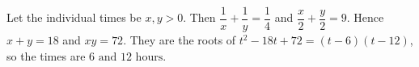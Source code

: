 Let the individual times be $x,y>0$. Then $\dfrac{1}{x}+\dfrac{1}{y}=\dfrac{1}{4}$ and $\dfrac{x}{2}+\dfrac{y}{2}=9$. Hence $x+y=18$ and $xy=72$. They are the roots of $t^2-18t+72=(t-6)(t-12)$, so the times are $\boxed{6\text{ and }12\text{ hours}}$.

